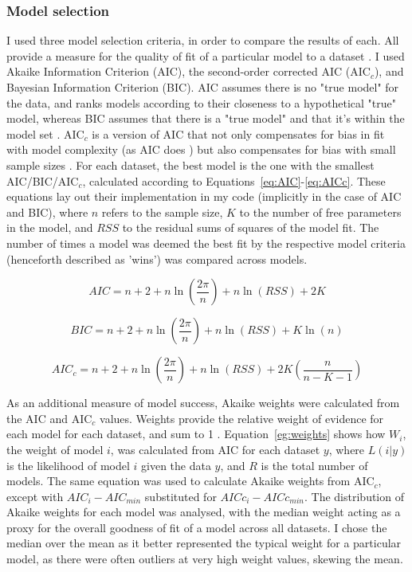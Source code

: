 \documentclass[11pt, a4paper]{article}
\begin{document}
	\subsubsection*{Model selection}
		I used three model selection criteria, in order to compare the results of each. All provide a measure for the quality of fit of a particular model to a dataset \cite{sakamotoAkaikeInformationCriterion1988}. I used Akaike Information Criterion (AIC), the second-order corrected AIC (AIC$_c$), and Bayesian Information Criterion (BIC). AIC assumes there is no "true model" for the data, and ranks models according to their closeness to a hypothetical "true" model, whereas BIC assumes that there is a "true model" and that it's within the model set \cite{burnhamModelSelectionMultimodel2002}. AIC$_c$ is a version of AIC that not only compensates for bias in fit with model complexity (as AIC does \cite{akaikeNewLookStatistical1974}) but also compensates for bias with small sample sizes \cite{hurvichRegressionTimeSeries1989}. For each dataset, the best model is the one with the smallest AIC/BIC/AIC$_c$, calculated according to Equations~\ref{eq:AIC}-\ref{eq:AICc}. These equations lay out their implementation in my code (implicitly in the case of AIC and BIC), where $n$ refers to the sample size, $K$ to the number of free parameters in the model, and $RSS$ to the residual sums of squares of the model fit. The number of times a model was deemed the best fit by the respective model criteria (henceforth described as 'wins') was compared across models. 
	
	\begin{equation} \label{eq:AIC}
	AIC = n + 2 + n\ln
		\left(
			\frac{2\pi}{n}								\right) 
	+ n\ln(RSS) + 2K
	\end{equation}
	
	\begin{equation} \label{eq:BIC}
	BIC = n + 2 + n\ln
		\left(
			\frac{2\pi}{n}								\right) 
	+ n\ln(RSS) + K\ln(n)
	\end{equation}
	
	\begin{equation} \label{eq:AICc}
	AIC_c = n + 2 + n\ln
		\left(
			\frac{2\pi}{n}								\right) 
	+ n\ln(RSS) + 2K 
		\left(
			\frac{n}{n - K - 1}
		\right)
	\end{equation}

	As an additional measure of model success, Akaike weights were calculated from the AIC and AIC$_c$ values. Weights provide the relative weight of evidence for each model for each dataset, and sum to 1 \cite{johnsonModelSelectionEcology2004}. Equation~\ref{eg:weights} shows how $W_i$, the weight of model $i$, was calculated from AIC for each dataset $y$, where $L(i | y)$ is the likelihood of model $i$ given the data $y$, and $R$ is the total number of models. The same equation was used to calculate Akaike weights from AIC$_c$, except with $AIC_i - AIC_{min}$ substituted for $AICc_i - AICc_{min}$. The distribution of Akaike weights for each model was analysed, with the median weight acting as a proxy for the overall goodness of fit of a model across all datasets. I chose the median over the mean as it better represented the typical weight for a particular model, as there were often outliers at very high weight values, skewing the mean.
	
\end{document}
